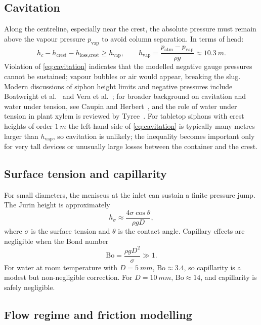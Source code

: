 \documentclass[11pt]{article}
\theoremstyle{definition}
\begin{document}
\subsection{Cavitation}

Along the centreline, especially near the crest, the absolute pressure must remain above 
the vapour pressure $p_{\text{vap}}$ to avoid column separation. In terms of head:
  \begin{equation}
    h_c - h_{\text{crest}} - h_{\text{loss,crest}} \ge h_{\text{vap}}, \qquad
    h_{\text{vap}} = \frac{p_{\text{atm}} - p_{\text{vap}}}{\rho g} \approx \SI{10.3}{m}.
    \label{eq:cavitation}
  \end{equation}
  Violation of \eqref{eq:cavitation} indicates that the modelled negative gauge pressures 
  cannot be sustained; vapour bubbles or air would appear, breaking the slug. Modern 
  discussions of siphon height limits and negative pressures include 
  Boatwright et al.~\cite{boatwright} and Vera et al.~\cite{vera}; for broader background on 
  cavitation and water under tension, see Caupin and Herbert~\cite{caupin_cavitation}, and the 
  role of water under tension in plant xylem is reviewed by Tyree~\cite{tyree}.
For tabletop siphons with crest heights of order $\SI{1}{m}$ the left-hand side of
\eqref{eq:cavitation} is typically many metres larger than $h_{\text{vap}}$, so cavitation is 
unlikely; the inequality becomes important only for very tall devices or unusually large 
losses between the container and the crest.

\subsection{Surface tension and capillarity}

For small diameters, the meniscus at the inlet can sustain a finite pressure jump. The 
Jurin height is approximately~\cite{white}
\[
  h_\sigma \approx \frac{4\sigma \cos\theta}{\rho g D},
\]
where $\sigma$ is the surface tension and $\theta$ is the contact angle. Capillary effects 
are negligible when the Bond number
\[
  \text{Bo} = \frac{\rho g D^2}{\sigma} \gg 1.
\]
For water at room temperature with $D = \SI{5}{mm}$, $\text{Bo} \approx 3.4$, so capillarity 
is a modest but non-negligible correction. For $D = \SI{10}{mm}$, $\text{Bo} \approx 14$, 
and capillarity is safely negligible.

\subsection{Flow regime and friction modelling}
\end{document}
